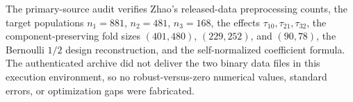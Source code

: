 The primary-source audit verifies Zhao's released-data preprocessing counts, the target populations \(n_1=881\), \(n_2=481\), \(n_3=168\), the effects \(\tau_{10},\tau_{21},\tau_{32}\), the component-preserving fold sizes \((401,480)\), \((229,252)\), and \((90,78)\), the Bernoulli \(1/2\) design reconstruction, and the self-normalized coefficient formula.  The authenticated archive did not deliver the two binary data files in this execution environment, so no robust-versus-zero numerical values, standard errors, or optimization gaps were fabricated.